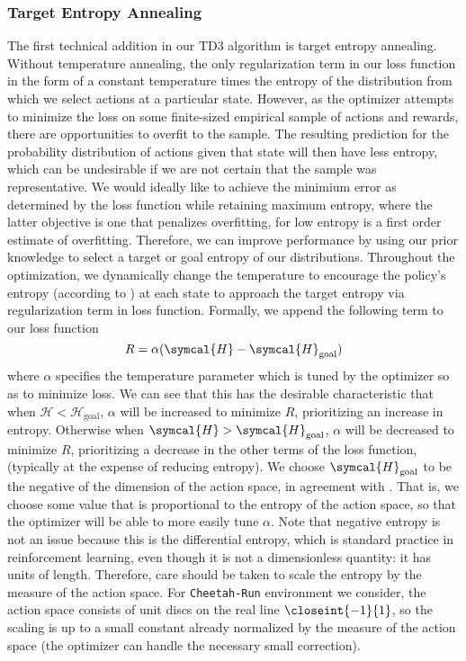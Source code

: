 \documentclass[base]{subfiles}
\begin{document}
\subsubsection{Target Entropy Annealing} \label{teakneel}
The first technical addition in our TD3 algorithm is target entropy annealing.
Without temperature annealing, the only regularization term in our loss function in the form of a constant temperature times the entropy of the distribution from which we select actions at a particular state.
However, as the optimizer attempts to minimize the loss on some finite-sized empirical sample of actions and rewards, there are opportunities to overfit to the sample.
The resulting prediction for the probability distribution of actions given that state will then have less entropy, which can be undesirable if we are not certain that the sample was representative.
We would ideally like to achieve the minimium error as determined by the loss function while retaining maximum entropy, where the latter objective is one that penalizes overfitting, for low entropy is a first order estimate of overfitting.
Therefore, we can improve performance by using our prior knowledge to select a target or goal entropy of our distributions.
Throughout the optimization, we dynamically change the temperature to encourage the policy's entropy (according to \cite{sac}) at each state to approach the target entropy via regularization term in loss function.
Formally, we append the following term to our loss function
\begin{equation}
	R = \alpha (\symcal{H} - \symcal{H}_{\text{goal}})
\end{equation}
where \(\alpha\) specifies the temperature parameter which is tuned by the optimizer so as to minimize loss.
We can see that this has the desirable characteristic that when \(\mathcal{H} <  \mathcal{H}_{\text{goal}}\), \(\alpha\) will be increased to minimize \(R\), prioritizing an increase in entropy.
Otherwise when \(\symcal{H} > \symcal{H}_{\text{goal}}\), \(\alpha\) will be decreased to minimize \(R\), prioritizing a decrease in the other terms of the loss function, (typically at the expense of reducing entropy).
We choose \(\symcal{H}_{\text{goal}}\) to be the negative of the dimension of the action space, in agreement with \cite{kim2023}.
That is, we choose some value that is proportional to the entropy of the action space, so that the optimizer will be able to more easily tune \(\alpha\).
Note that negative entropy is not an issue because this is the differential entropy, which is standard practice in reinforcement learning, even though it is not a dimensionless quantity: it has units of length.
Therefore, care should be taken to scale the entropy by the measure of the action space.
For \texttt{Cheetah-Run} environment we consider, the action space consists of unit discs on the real line \(\closeint{-1}{1}\), so the scaling is up to a small constant already normalized by the measure of the action space (the optimizer can handle the necessary small correction).
\end{document}
